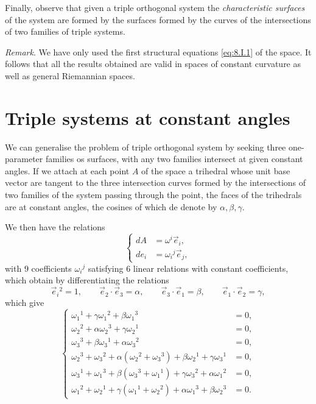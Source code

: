 \documentclass[leqno,11pt]{book}
\numberwithin{equation}{chapter}
\theoremstyle{shape1}
\theoremstyle{shape0}
\theoremstyle{shape2}
\theoremstyle{definition}
\begin{document}
Finally, observe that given a triple orthogonal system the \emph{characteristic surfaces} of the system are formed by the surfaces formed by the curves of the intersections of two families of triple systems.

\emph{Remark}. We have only used the first structural equations \eqref{eq:8.I.1} of the space. It follows that all the results obtained are valid in spaces of constant curvature as well as general Riemannian spaces.

\section{Triple systems at constant angles}
\label{sec:three-systems-with}

\fsec We can generalise the problem of triple orthogonal system by seeking three one-parameter families os surfaces, with any two families intersect at given constant angles. If we attach at each point $A$ of the space a trihedral whose unit base vector are tangent to the three intersection curves formed by the intersections of two families of the system passing through the point, the faces of the trihedrals are at constant angles, the cosines of which de denote by $\alpha,\beta,\gamma$.

We then have the relations
\begin{equation}
  \label{eq:8.II.1}\tag{II, 1}
  \left\{
    \begin{aligned}
      dA&=\omega^{i}\vec e_{i},\\
      de_{i}&=\omega_{i}{}^{j}\vec e_{j},
    \end{aligned}
  \right.
\end{equation}
with $9$ coefficients $\omega_{i}{}^{j}$ satisfying $6$ linear relations with constant coefficients, which obtain by differentiating the relations
\[
\vec e_{i}{}^{2}=1,\qquad\vec e_{2}\cdot \vec e_{3}=\alpha,\qquad\vec e_{3}\cdot\vec e_{1}=\beta,\qquad\vec e_{1}\cdot\vec e_{2}=\gamma,
\]
which give
\begin{equation}
  \label{eq:8.II.2}\tag{II, 2}
  \left\{
    \begin{aligned}
      \omega_{1}{}^{1}+\gamma\omega_{1}{}^{2}+\beta\omega_{1}{}^{3}&=0,\\
      \omega_{2}{}^{2}+\alpha\omega_{2}{}^{3}+\gamma\omega_{2}{}^{1}&=0,\\
      \omega_{3}{}^{3}+\beta\omega_{3}{}^{1}+\alpha\omega_{3}{}^{2}&=0,\\
      \omega_{2}{}^{3}+\omega_{3}{}^{2}+\alpha(\omega_{2}{}^{2}+\omega_{3}{}^{3})+\beta\omega_{2}{}^{1}+\gamma\omega_{3}{}^{1}&=0,\\
      \omega_{3}{}^{1}+\omega_{1}{}^{3}+\beta(\omega_{3}{}^{3}+\omega_{1}{}^{1})+\gamma\omega_{3}{}^{2}+\alpha\omega_{1}{}^{2}&=0,\\
      \omega_{1}{}^{2}+\omega_{2}{}^{1}+\gamma(\omega_{1}{}^{1}+\omega_{2}{}^{2})+\alpha\omega_{1}{}^{3}+\beta\omega_{2}{}^{3}&=0.
    \end{aligned}
  \right.
\end{equation}
\end{document}

